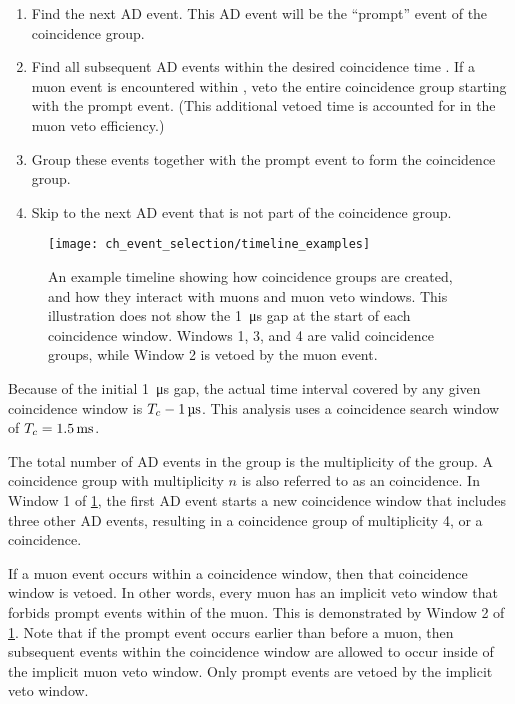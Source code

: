 \begin{enumerate}
    \item Find the next AD event.
        This AD event will be the ``prompt'' event of the coincidence group.
    \item Find all subsequent AD events within the desired coincidence time \tc.
        If a muon event is encountered within \tc,
        veto the entire coincidence group starting with the prompt event.
        (This additional vetoed time is accounted for in the muon veto efficiency.)
    \item Group these events together with the prompt event
        to form the coincidence group.
    \item Skip to the next AD event that is not part of the coincidence group.
\end{enumerate}

\begin{figure}
    \texttt{[image: ch\_event\_selection/timeline\_examples]}
    \caption{
        An example timeline showing how coincidence groups are created,
        and how they interact with muons and muon veto windows.
        This illustration does not show the \SI{1}{\micro\second} gap
        at the start of each coincidence window.
        Windows 1, 3, and 4 are valid coincidence groups,
        while Window 2 is vetoed by the muon event.
    }
    \label{fig:timeline_examples}
\end{figure}

Because of the initial \SI{1}{\micro\second} gap,
the actual time interval covered by any given coincidence window is
$T_c - \SI{1}{\micro\second}$.
This analysis uses a coincidence search window of $T_c = \SI{1.5}{\milli\second}$.

The total number of AD events in the group
is the multiplicity of the group.
A coincidence group with multiplicity $n$ is also referred to
as an  coincidence.
In Window 1 of \cref{fig:timeline_examples},
the first AD event starts a new coincidence window
that includes three other AD events,
resulting in a coincidence group of multiplicity 4, or a  coincidence.

If a muon event occurs within a coincidence window,
then that coincidence window is vetoed.
In other words, every muon has an implicit veto window
that forbids prompt events within \tc{} of the muon.
This is demonstrated by Window 2 of \cref{fig:timeline_examples}.
Note that if the prompt event occurs earlier than \tc{} before a muon,
then subsequent events within the coincidence window
are allowed to occur inside of the implicit muon veto window.
Only prompt events are vetoed by the implicit veto window.

